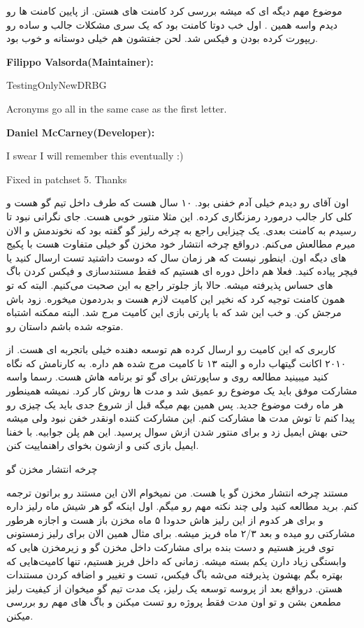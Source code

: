 موضوع مهم دیگه ای که میشه بررسی کرد کامنت های  هستن. از پایین کامنت ها رو دیدم واسه همین \cl. اول خب دوتا کامنت بود
که یک سری مشکلات جالب و ساده رو ریپورت کرده بودن و فیکس شد. لحن جفتشون هم خیلی دوستانه و خوب بود.

\begin{latin}
\textbf{Filippo Valsorda(Maintainer):}

TestingOnlyNewDRBG

Acronyms go all in the same case as the first letter.

\textbf{Daniel McCarney(Developer):}

I swear I will remember this eventually :)

Fixed in patchset 5. Thanks
\end{latin}

اون آقای  رو دیدم خیلی آدم خفنی بود. ۱۰ سال هست که طرف داخل تیم گو هست و کلی کار جالب درمورد رمزنگاری کرده.
این مثلا منتور خوبی هست. جای نگرانی نبود تا رسیدم به کامنت بعدی. یک چیزایی راجع به چرخه رلیز گو
گفته بود که نخوندمش و الان میرم مطالعش می‌کنم. درواقع چرخه انتشار خود مخزن گو خیلی متفاوت هست با پکیج های دیگه اون.
اینطور نیست که هر زمان سال که دوست داشتید تست ارسال کنید یا فیچر پیاده کنید. فعلا هم داخل دوره ای هستیم که فقط مستندسازی و فیکس کردن باگ
های حساس پذیرفته میشه. حالا باز جلوتر راجع به این  صحبت می‌کنیم. البته که تو همون کامنت  توجیه کرد که نخیر این کامیت
لازم هست و بدردمون میخوره. زود باش مرجش کن. و خب این شد که با پارتی بازی این کامیت مرج شد. البته ممکنه اشتباه متوجه شده باشم داستان رو.

کاربری که این کامیت رو ارسال کرده هم توسعه دهنده خیلی باتجربه ای هست. از ۲۰۱۰ اکانت گیتهاب داره و البته ۱۳ تا کامیت مرج شده هم داره.
به کارنامش که نگاه کنید میبینید مطالعه روی  و ساپورتش برای گو تو برنامه هاش هست. رسما واسه مشارکت موفق باید یک موضوع رو عمیق
شد و مدت ها روش کار کرد. نمیشه همینطور هر ماه رفت موضوع جدید. پس همین بهم میگه قبل از شروع جدی باید یک چیزی رو پیدا کنم تا توش
مدت ها مشارکت کنم. این مشارکت کننده اونقدر خفن نبود ولی میشه حتی بهش ایمیل زد و برای منتور شدن ازش سوال پرسید. این هم پلن جوابیه.
با خفنا ایمیل بازی کنی و ازشون بخوای راهنماییت کنن.

{\LARGE چرخه انتشار مخزن گو}

مستند چرخه انتشار مخزن گو یا 
هست. من نمیخوام الان این مستند رو براتون ترجمه کنم. برید مطالعه کنید ولی چند نکته مهم رو میگم. اول اینکه گو هر شیش ماه رلیز داره
و برای هر کدوم از این رلیز هاش حدودا ۵ ماه مخزن باز هست و اجازه هرطور مشارکتی رو میده و بعد ۲/۳ ماه فریز میشه. برای مثال همین الان
برای رلیز زمستونی توی فریز هستیم و دست بنده برای مشارکت داخل مخزن گو و زیرمخزن هایی که وابستگی زیاد دارن یکم بسته میشه.
زمانی که داخل فریز هستیم، تنها کامیت‌هایی که بهتره بگم \cl بهشون پذیرفته می‌شه باگ فیکس، تست و تغییر و اضافه کردن مستندات هستن.
درواقع بعد از پروسه توسعه یک رلیز، یک مدت تیم گو میخوان از کیفیت رلیز مطمعن بشن و تو اون مدت فقط پروژه رو تست میکنن و باگ های مهم رو
بررسی میکنن.

